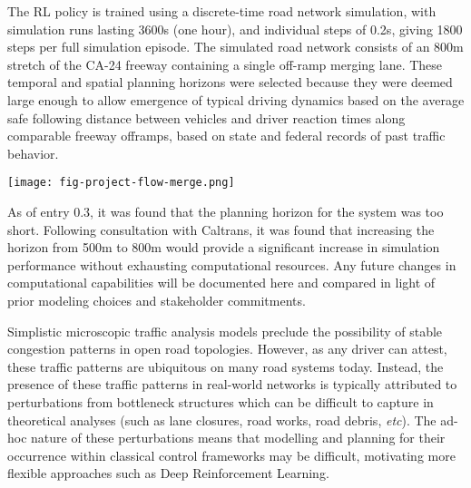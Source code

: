 \documentclass[12pt, a4paper, twocolumn]{article}
\newenvironment{Figure}
  {\par\medskip\noindent\minipage{\linewidth}}
  {\endminipage\par\medskip}
\begin{document}
\begin{multicols}{2}
{The RL policy is trained using a discrete-time road network simulation, with simulation runs lasting 3600s (one hour), and individual steps of 0.2s, giving 1800 steps per full simulation episode.
The simulated road network consists of an 800m stretch of the CA-24 freeway containing a single off-ramp merging lane.
These temporal and spatial planning horizons were selected because they were deemed large enough to allow emergence of typical driving dynamics based on the average safe following distance between vehicles and driver reaction times along comparable freeway offramps, based on state and federal records of past traffic behavior.

\begin{Figure}
    \texttt{[image: fig-project-flow-merge.png]}
    \label{fig:env}
\end{Figure}

As of entry 0.3, it was found that the planning horizon for the system was too short. 
Following consultation with Caltrans, it was found that increasing the horizon from 500m to 800m would provide a significant increase in simulation performance without exhausting computational resources.
Any future changes in computational capabilities will be documented here and compared in light of prior modeling choices and stakeholder commitments.

Simplistic microscopic traffic analysis models preclude the possibility of stable congestion patterns in open road topologies. However, as any driver can attest, these traffic patterns are ubiquitous on many road systems today.
Instead, the presence of these traffic patterns in real-world networks is typically attributed to perturbations from bottleneck structures which can be difficult to capture in theoretical analyses (such as lane closures, road works, road debris, \textit{etc}). \cite{Kreidieh2018Dissipating}
The ad-hoc nature of these perturbations means that modelling and planning for their occurrence within classical control frameworks may be difficult, motivating more flexible approaches such as Deep Reinforcement Learning.

}
\end{multicols}
\end{document}
